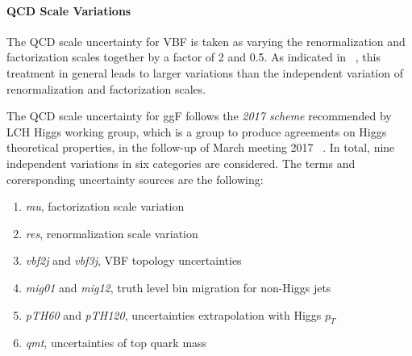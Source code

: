 % 

\paragraph{QCD Scale Variations}

The QCD scale uncertainty for VBF is taken as varying the renormalization
and factorization scales together by a factor of 2 and 0.5. As indicated in ~\cite{QCDscale_vbf}, 
this treatment in general leads to larger variations than the independent variation of renormalization
and factorization scales. 

The QCD scale uncertainty for ggF follows the \textit{2017 scheme} recommended by 
LCH Higgs working group, which is a group to produce agreements on Higgs theoretical properties,
in the follow-up of March meeting 2017 ~\cite{QCDscale_ggF}. In total, nine independent 
variations in six categories are considered. The terms and corersponding uncertainty sources 
are the following:

\begin{enumerate}
\item \textit{mu}, factorization scale variation
\item \textit{res}, renormalization scale variation
\item \textit{vbf2j} and \textit{vbf3j}, VBF topology uncertainties
\item \textit{mig01} and \textit{mig12}, truth level bin migration for non-Higgs jets
\item \textit{pTH60} and \textit{pTH120}, uncertainties extrapolation with Higgs $p_T$
\item \textit{qmt}, uncertainties of top quark mass
\end{enumerate}

